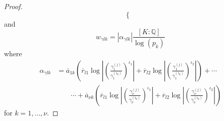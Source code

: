 \begin{proof}
\[\begin{cases}
\end{cases}\]
and 
\[w_{\gamma l k} = |\alpha_{\gamma l k}|\frac{[K:\mathbb{Q}]}{\log(p_k)}\]
where
\begin{align*}
\alpha_{\gamma l k} 
	& = \overline{a}_{1k} \left(\overline{r}_{l1} \log\left| \left( \frac{\gamma_1^{(j)}}{\gamma_1^{(i_0)}}\right)^{\iota_1}\right|+ \overline{r}_{l2}\log\left| \left( \frac{\gamma_1^{(j)}}{\gamma_1^{(i_0)}}\right)^{\iota_2}\right|\right) + \cdots \\
	& \quad \quad \cdots + \overline{a}_{\nu k} \left(\overline{r}_{l1} \log\left| \left( \frac{\gamma_{\nu}^{(j)}}{\gamma_{\nu}^{(i_0)}}\right)^{\iota_1}\right|+ \overline{r}_{l2}\log\left| \left( \frac{\gamma_{\nu}^{(j)}}{\gamma_{\nu}^{(i_0)}}\right)^{\iota_2}\right|\right)
\end{align*}
for $k = 1, \dots, \nu$.


\end{proof}
